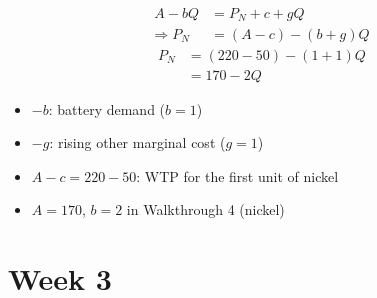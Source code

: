 \documentclass{beamer}
\begin{document}
\begin{frame}[plain,label=w2_appC_derived]
  \Large
  \begin{align*}
    \tag{30}\;A - bQ &= P_N + c + gQ\\
    \Rightarrow P_N &= (A - c) - (b + g)Q
  \end{align*}
  \begin{align*}
    \tag{31}\;P_N &= (220 - 50) - (1 + 1)Q\\
                  &= 170 - 2Q
  \end{align*}

  \vspace{0.3em}
  \begin{itemize}\Large
    \item $-b$: battery demand ($b = 1$)
    \item $-g$: rising other marginal cost ($g = 1$)
    \item $A - c = 220 - 50$: WTP for the first unit of nickel
    \item $A = 170$, $b = 2$ in Walkthrough 4 (nickel)
  \end{itemize}
\end{frame}



\section{Week 3}
\end{document}
